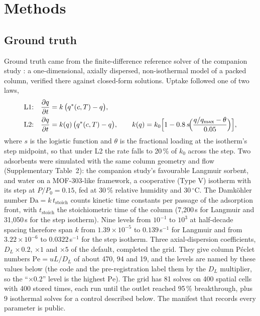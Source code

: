 \documentclass[11pt]{article}
\newcommand{\Da}{\mathrm{Da}}
\newcommand{\Pe}{\mathrm{Pe}}
\newcommand{\qs}{q^{*}}
\begin{document}
\clearpage
\section*{Methods}

\subsection*{Ground truth}
Ground truth came from the finite-difference reference solver of the companion
study \citep{paper1}: a one-dimensional, axially dispersed, non-isothermal model of a
packed column, verified there against closed-form solutions. Uptake followed one of two
laws,
\begin{align}
\text{L1:}\quad & \frac{\partial q}{\partial t} = k\,\bigl(\qs(c,T) - q\bigr),\\
\text{L2:}\quad & \frac{\partial q}{\partial t} = k(q)\,\bigl(\qs(c,T) - q\bigr),\qquad
k(q) = k_0\Bigl[1 - 0.8\,s\!\Bigl(\frac{q/q_{\max}-\theta}{0.05}\Bigr)\Bigr],
\end{align}
where $s$ is the logistic function and $\theta$ is the fractional loading at the
isotherm's step midpoint, so that under L2 the rate falls to 20\,\% of $k_0$ across the step.
Two adsorbents were simulated with the same column geometry and flow (Supplementary
Table~2): the companion study's favourable Langmuir sorbent, and water on a MOF-303-like
framework, a cooperative (Type V) isotherm with its step at $P/P_0 = 0.15$, fed at 30\,\%
relative humidity and 30\,$^\circ$C. The Damk\"ohler number $\Da = k\,t_{\mathrm{stoich}}$
counts kinetic time constants per passage of the adsorption front, with
$t_{\mathrm{stoich}}$ the stoichiometric time of the column (7,200\,s for Langmuir and
31,050\,s for the step isotherm). Nine levels from $10^{-1}$ to $10^{3}$ at half-decade
spacing therefore span $k$ from $1.39\times10^{-5}$ to $0.139$\,s$^{-1}$ for Langmuir and
from $3.22\times10^{-6}$ to $0.0322$\,s$^{-1}$ for the step isotherm. Three axial-dispersion
coefficients, $D_L \times 0.2$, $\times 1$ and $\times 5$ of the default, completed the grid.
They give column P\'eclet numbers $\Pe = uL/D_L$ of about 470, 94 and 19, and the levels are
named by these values below (the code and the pre-registration label them by the $D_L$
multiplier, so the ``$\times 0.2$'' level is the highest $\Pe$). The grid has 81 solves on 400 spatial cells with 400 stored times, each run until the outlet reached 95\,\%
breakthrough, plus 9 isothermal solves for a control described below. The manifest that
records every parameter is public.
\end{document}
